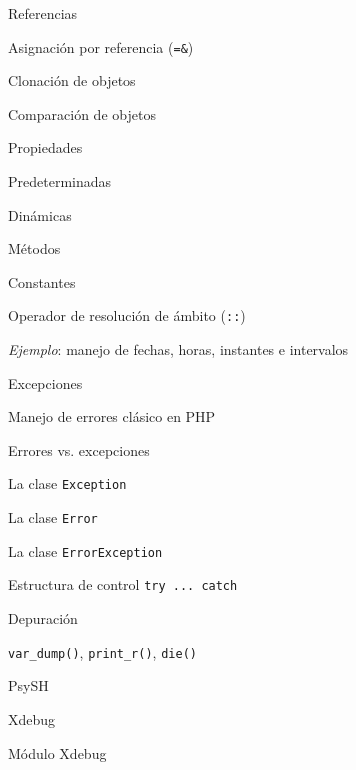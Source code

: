 \begin{longenum}
\begin{longenum}
\begin{longenum}
            \item Referencias
            \begin{longenum}
                \item Asignación por referencia (\texttt{=\&})
            \end{longenum}
            \item Clonación de objetos
            \item Comparación de objetos
            \item Propiedades
            \begin{longenum}
                \item Predeterminadas
                \item Dinámicas
            \end{longenum}
            \item Métodos
            \item Constantes
            \begin{longenum}
                \item Operador de resolución de ámbito (\texttt{::})
            \end{longenum}
            \item \textit{Ejemplo}: manejo de fechas, horas, instantes e intervalos
        \end{longenum}
        \item Excepciones
        \begin{longenum}
            \item Manejo de errores clásico en PHP
            \item Errores vs. excepciones
            \item La clase \texttt{Exception}
            \item La clase \texttt{Error}
            \item La clase \texttt{ErrorException}
            \item Estructura de control \texttt{try ... catch}
        \end{longenum}
        \item Depuración
        \begin{longenum}
            \item \texttt{var\_dump()}, \texttt{print\_r()}, \texttt{die()}
            \item PsySH
            \item Xdebug \opcional\
            \begin{longenum}
                \item Módulo Xdebug

\end{longenum}
\end{longenum}
\end{longenum}
\end{longenum}
